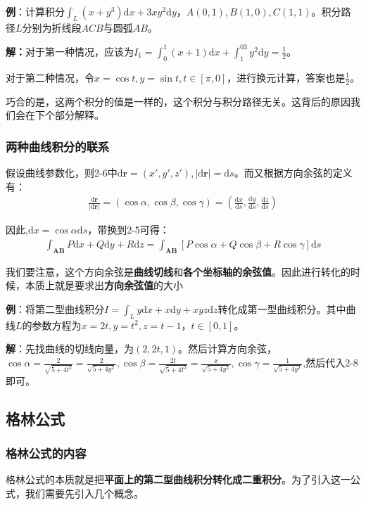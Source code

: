 \documentclass{ctexart}
\let\oldtextbf\textbf
\renewcommand{\textbf}[1]{\textcolor{brown!50!red}{\oldtextbf{#1}}}
\begin{document}
\textbf{\color{brown!50!red}例}：计算积分$\int_L(x+y^3)\mathrm{d}x+3xy^2\mathrm{d}y，A(0,1),B(1,0),C(1,1)$。积分路径$L$分别为折线段$ACB$与圆弧$AB$。

\textbf{\color{brown!50!red}解：}对于第一种情况，应该为$I_1=\int_0^1(x+1)\mathrm{d}x+\int_1^03y^2\mathrm{d}y=\frac{1}{2}$。

对于第二种情况，令$x=\cos t,y=\sin t,t\in[\pi,0]$，进行换元计算，答案也是$\frac{1}{2}$。

巧合的是，这两个积分的值是一样的，这个积分与积分路径无关。这背后的原因我们会在下个部分解释。

\subsubsection{两种曲线积分的联系}
假设曲线参数化，则2-6中$\mathrm{d}\bm{r}=(x',y',z'),|\mathrm{d}\bm{r}|=\mathrm{d}s$。而又根据方向余弦的定义有：
\begin{align*}
   \frac{\mathrm{d}\bm{r} }{|\mathrm{d}\bm{r} |} =(\cos\alpha ,\cos\beta ,\cos\gamma ) =(\frac{\mathrm{d}x}{\mathrm{d}s},\frac{\mathrm{d}y}{\mathrm{d}s},\frac{\mathrm{d}z}{\mathrm{d}s})\tag{2-7}
\end{align*}

因此,$\mathrm{d}x=\cos\alpha\mathrm{d}s$，带换到2-5可得：
\begin{align*}
\int_{\bm{AB}}P\mathrm{d}x+Q\mathrm{d}y+R\mathrm{d}z=
\int_{\bm{AB}}[P\cos\alpha+Q\cos\beta+R\cos\gamma ]\mathrm{d}s\tag{2-8} 
\end{align*}

我们要注意，这个方向余弦是\textbf{\color{brown!50!red}曲线切线}和\textbf{\color{brown!50!red}各个坐标轴的余弦值}。因此进行转化的时候，本质上就是要求出\textbf{\color{brown!50!red}方向余弦值}的大小

\textbf{\color{brown!50!red}例}：将第二型曲线积分$I=\int_L y\mathrm{d}x+x\mathrm{d}y+xyz\mathrm{d}z$转化成第一型曲线积分。其中曲线$L$的参数方程为$x=2t,y=t^2,z=t-1，t\in[0,1]$。

\textbf{\color{brown!50!red}解}：先找曲线的切线向量，为$(2,2t,1)$。然后计算方向余弦，$\cos\alpha=\frac{2}{\sqrt{5+4t^2}}=\frac{2}{\sqrt{5+4y^2}},\cos\beta=\frac{2t}{\sqrt{5+4t^2}}=\frac{x}{\sqrt{5+4y^2}},\cos\gamma=\frac{1}{\sqrt{5+4y^2}}$,然后代入2-8即可。

\subsection{格林公式}
\subsubsection{格林公式的内容}
格林公式的本质就是把\textbf{\color{brown!50!red}平面上的第二型曲线积分转化成二重积分}。为了引入这一公式，我们需要先引入几个概念。
\end{document}
